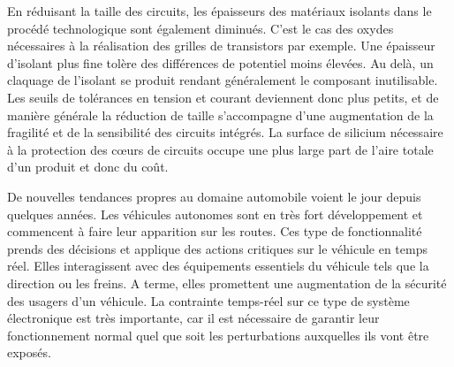 En réduisant la taille des circuits, les épaisseurs des matériaux isolants dans le procédé technologique sont également diminués.
C'est le cas des oxydes nécessaires à la réalisation des grilles de transistors par exemple.
Une épaisseur d'isolant plus fine tolère des différences de potentiel moins élevées.
Au delà, un claquage de l'isolant se produit rendant généralement le composant inutilisable.
Les seuils de tolérances en tension et courant deviennent donc plus petits, et de manière générale la réduction de taille s'accompagne d'une augmentation de la fragilité et de la sensibilité des circuits intégrés.
La surface de silicium nécessaire à la protection des cœurs de circuits occupe une plus large part de l'aire totale d'un produit  \cite{evolution_technologies} et donc du coût.

De nouvelles tendances propres au domaine automobile voient le jour depuis quelques années.
Les véhicules autonomes sont en très fort développement et commencent à faire leur apparition sur les routes.
Ces type de fonctionnalité prends des décisions et applique des actions critiques sur le véhicule en temps réel.
Elles interagissent avec des équipements essentiels du véhicule tels que la direction ou les freins.
A terme, elles promettent une augmentation de la sécurité des usagers d'un véhicule.
La contrainte temps-réel sur ce type de système électronique est très importante, car il est nécessaire de garantir leur fonctionnement normal quel que soit les perturbations auxquelles ils vont être exposés.

